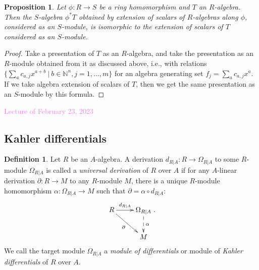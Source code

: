 \documentclass{amsart}[12pt]
\newcommand{\Feb}[1]{\textcolor{violet}{Lecture of February #1, 2023}}
\newcommand{\N}{\mathbb{N}}
\numberwithin{equation}{section}
\theoremstyle{plain} %
\newtheorem{prop}[equation]{Proposition}
\theoremstyle{definition}
\newtheorem{defn}[equation]{Definition}
\theoremstyle{remark}
\newcommand{\ssec}[1]{\subsection{#1}}
\begin{document}
\begin{prop} Let $\phi:R\to S$ be a ring homomorphism and $T$ an $R$-algebra. Then the $S$-algebra $\phi^* T$ obtained by extension of scalars of $R$-algebras along $\phi$, considered as an $S$-module, is isomorphic to the extension of scalars of $T$ considered as an $S$-module.
\end{prop}
\begin{proof}
Take a presentation of $T$ as an $R$-algebra, and take the presentation as an $R$-module obtained from it as discussed above, i.e., with relations $\{\sum_a c_{a,j} x^{a+b} \ | \ b\in \N^n, j=1,\dots,m\}$ for an algebra generating set $f_j=\sum_a c_{a,j} x^a$. If we take algebra extension of scalars of $T$, then we get the same presentation as an $S$-module by this formula.
\end{proof}


\Feb{23}

\ssec{Kahler differentials}

\begin{defn} Let $R$ be an $A$-algebra. A derivation $d_{R|A}:R\to \Omega_{R|A}$ to some $R$-module $\Omega_{R|A}$ is called a \emph{universal derivation} of $R$ over $A$ if for any $A$-linear derivation $\partial:R\to M$ to any $R$-module $M$, there is a unique $R$-module homomorphism $\alpha:\Omega_{R|A}\to M$ such that $\partial = \alpha\circ d_{R|A}$:
\[  \xymatrix{  R \ar[r]^-{d_{R|A}} \ar[dr]_-{\partial} & \Omega_{R|A} \ar@{-->}[d]^-{\alpha} \\ & M}.\]
We call the target module $\Omega_{R|A}$ a \emph{module of differentials} or module of \emph{Kahler differentials} of $R$ over $A$.
\end{defn}
\end{document}
